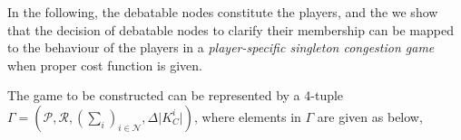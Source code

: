 In the following, the debatable nodes constitute the players, and the 
we show that the decision of debatable nodes to clarify their membership can be mapped to the behaviour of the players in a \textit{player-specific singleton congestion game} when proper cost function is given.

The game to be constructed can be represented by a 4-tuple $\Gamma=(\mathcal{P},\mathcal{R},(\sum_i)_{i \in \mathcal{N}},\Delta\vert K^i_C \vert)$, where elements in $\Gamma$ are given as below,


